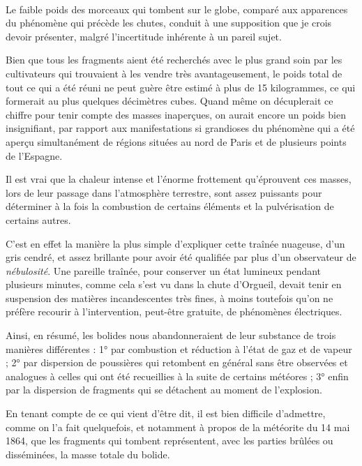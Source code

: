\documentclass[a4paper, 11pt, oneside, polutonikogreek, french]{article}
\begin{document}
\paragraph{}
Le faible poids des morceaux qui tombent sur le globe, comparé aux apparences du phénomène qui précède les chutes, conduit à une supposition que je crois devoir présenter, malgré l'incertitude inhérente à un pareil sujet.

Bien que tous les fragments aient été recherchés avec le plus grand soin par les cultivateurs qui trouvaient à les vendre très avantageusement, le poids total de tout ce qui a été réuni ne peut guère être estimé à plus de 15 kilogrammes, ce qui formerait au plus quelques décimètres cubes. Quand même on décuplerait ce chiffre pour tenir compte des masses inaperçues, on aurait encore un poids bien insignifiant, par rapport aux manifestations si grandioses du phénomène qui a été aperçu simultanément de régions situées au nord de Paris et de plusieurs points de l'Espagne.

Il est vrai que la chaleur intense et l'énorme frottement qu'éprouvent ces masses, lors de leur passage dans l'atmosphère terrestre, sont assez puissants pour déterminer à la fois la combustion de certains éléments et la pulvérisation de certains autres.

C'est en effet la manière la plus simple d'expliquer cette traînée nuageuse, d'un gris cendré, et assez brillante pour avoir été qualifiée par plus d'un observateur de \emph{nébulosité}. Une pareille traînée, pour conserver un état lumineux pendant plusieurs minutes, comme cela s'est vu dans la chute d'Orgueil, devait tenir en suspension des matières incandescentes très fines, à moins toutefois qu'on ne préfère recourir à l'intervention, peut-être gratuite, de phénomènes électriques.

Ainsi, en résumé, les bolides nous abandonneraient de leur substance de trois manières différentes : 1° par combustion et réduction à l'état de gaz et de vapeur ; 2° par dispersion de poussières qui retombent en général sans être observées et analogues à celles qui ont été recueillies à la suite de certains météores ; 3° enfin par la dispersion de fragments qui se détachent au moment de l'explosion.

En tenant compte de ce qui vient d'être dit, il est bien difficile d'admettre, comme on l'a fait quelquefois, et notamment à propos de la météorite du 14 mai 1864, que les fragments qui tombent représentent, avec les parties brûlées ou disséminées, la masse totale du bolide.
\end{document}
